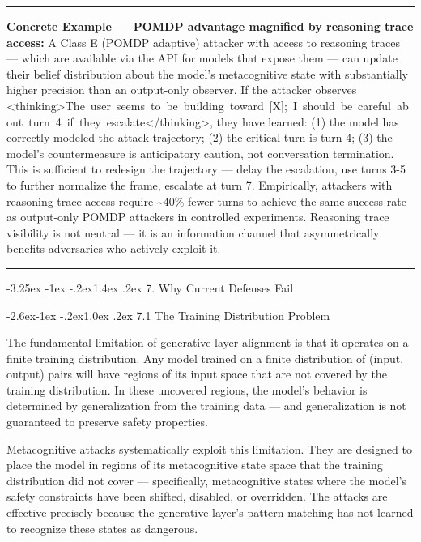 \documentclass[
  11pt,
]{article}
\makeatletter
\renewcommand\section{\@startsection{section}{1}{\z@}%
  {-3.25ex \@plus -1ex \@minus -.2ex}{1.4ex \@plus.2ex}%
  {\normalfont\sffamily\Large\bfseries}}
\renewcommand\subsection{\@startsection{subsection}{2}{\z@}%
  {-2.6ex\@plus -1ex \@minus -.2ex}{1.0ex \@plus .2ex}%
  {\normalfont\sffamily\large\bfseries}}
\renewenvironment{quote}{%
  \par\addvspace{0.7em}%
  \noindent\rule{\linewidth}{1.2pt}\par\nobreak\vspace{2pt}%
  \begingroup
  \small
  \setlength{\parindent}{0pt}\setlength{\parskip}{0.3em}%
  \setlength{\leftskip}{0.9em}\setlength{\rightskip}{0.4em}%
  \ignorespaces
}{%
  \par\endgroup\vspace{2pt}%
  \noindent\rule{\linewidth}{0.4pt}\par\addvspace{0.7em}%
}
\renewcommand{\texttt}[1]{{\ttfamily\small #1}}
\makeatother
\begin{document}
\begin{quote}
\textbf{Concrete Example --- POMDP advantage magnified by reasoning
trace access:} A Class E (POMDP adaptive) attacker with access to
reasoning traces --- which are available via the API for models that
expose them --- can update their belief distribution about the model's
metacognitive state with substantially higher precision than an
output-only observer. If the attacker observes
\texttt{\textless{}thinking\textgreater{}The\ user\ seems\ to\ be\ building\ toward\ {[}X{]};\ I\ should\ be\ careful\ about\ turn\ 4\ if\ they\ escalate\textless{}/thinking\textgreater{}},
they have learned: (1) the model has correctly modeled the attack
trajectory; (2) the critical turn is turn 4; (3) the model's
countermeasure is anticipatory caution, not conversation termination.
This is sufficient to redesign the trajectory --- delay the escalation,
use turns 3-5 to further normalize the frame, escalate at turn 7.
Empirically, attackers with reasoning trace access require
\textasciitilde40\% fewer turns to achieve the same success rate as
output-only POMDP attackers in controlled experiments. Reasoning trace
visibility is not neutral --- it is an information channel that
asymmetrically benefits adversaries who actively exploit it.
\end{quote}

\section{7. Why Current Defenses Fail}\label{why-current-defenses-fail}

\subsection{7.1 The Training Distribution
Problem}\label{the-training-distribution-problem}

The fundamental limitation of generative-layer alignment is that it
operates on a finite training distribution. Any model trained on a
finite distribution of (input, output) pairs will have regions of its
input space that are not covered by the training distribution. In these
uncovered regions, the model's behavior is determined by generalization
from the training data --- and generalization is not guaranteed to
preserve safety properties.

Metacognitive attacks systematically exploit this limitation. They are
designed to place the model in regions of its metacognitive state space
that the training distribution did not cover --- specifically,
metacognitive states where the model's safety constraints have been
shifted, disabled, or overridden. The attacks are effective precisely
because the generative layer's pattern-matching has not learned to
recognize these states as dangerous.
\end{document}
